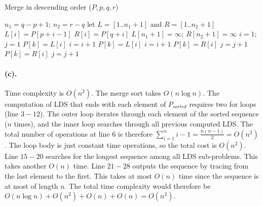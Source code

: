 \documentclass[12pt]{article}
\begin{document}
\begin{algorithm}[H]
     \caption{Merge in descending order (\(P, p, q, r\))}
     \begin{algorithmic}[1]
          \State \(n_1 = q-p+1\); \(n_2 = r-q\)
          \State let \(L=[1 .. n_1 + 1]\) and \(R=[1.. n_2 +1]\)
               \State \(L[i] = P[p+i-1]\) 
          \EndFor
               \State \(R[i] = P[q+i]\) 
          \EndFor
          \State \(L[n_1+1] = \infty\); \(R[n_2+1] = \infty\)
          \State \(i = 1\); \(j = 1\)
                
                    \State \(P[k] = L[i]\)
                    \State \(i = i + 1\)
                         \State \(P[k] = L[i]\)
                         \State \(i = i + 1\)
                    \Else 
                         \State \(P[k] = R[i]\)
                         \State \(j = j + 1\)
                    \EndIf
               \Else
                    \State \(P[k] = R[i]\)
                    \State \(j = j + 1\)
               \EndIf
          \EndFor
     \end{algorithmic}
\end{algorithm}

\paragraph{(c).} Time complexity is \(O(n^2)\). The merge sort takes \(O(n\log n)\). The computation of LDS that ends with each element of \(P_{sorted}\) requires two for loops (line \(3-12\)). The outer loop iterates through each element of the sorted sequence (\(n\) times), and the inner loop searches through all previous computed LDS. The total number of operations at line \(6\) is therefore \(\sum_{i=1}^n i-1 = \frac{n(n-1)}{2} = O(n^2)\). The loop body is just constant time operations, so the total cost is \(O(n^2)\). Line \(15-20\) searches for the longest sequence among all LDS sub-problems. This takes another \(O(n)\) time. Line \(21-28\) outputs the sequence by tracing from the last element to the first. This takes at most \(O(n)\) time since the sequence is at most of length \(n\). The total time complexity would therefore be \(O(n\log n) + O(n^2) + O(n) + O(n) = O(n^2)\).
\end{document}
